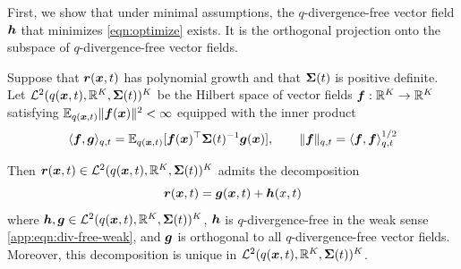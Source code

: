 First, we show that under minimal assumptions, the $q$-divergence-free vector field $\boldsymbol{h}$ that minimizes \cref{eqn:optimize} exists. It is the orthogonal projection onto the subspace of $q$-divergence-free vector fields.
\begin{theorem}\label{app:thm:hilbert-projection}
     Suppose that $\boldsymbol{r}(\boldsymbol{x}, t)$ has polynomial growth and that $\boldsymbol{\Sigma}(t)$ is positive definite. 
     Let $\mathcal{L}^2(q(\boldsymbol{x}, t), \mathbb{R}^K, \boldsymbol{\Sigma}(t))^K$ be the Hilbert space of vector fields $\boldsymbol{f}: \mathbb{R}^K \to \mathbb{R}^K$ satisfying $\mathbb{E}_{q(\boldsymbol{x}, t)}\|\boldsymbol{f}(\boldsymbol{x})\|^2 < \infty$ equipped with the inner product 
     \begin{equation}\label{app:eqn:l2-inner-prod}
         \langle \boldsymbol{f}, \boldsymbol{g} \rangle_{q, t} = \mathbb{E}_{q(\boldsymbol{x}, t)} [\boldsymbol{f}(\boldsymbol{x})^\top \boldsymbol{\Sigma}(t)^{-1} \boldsymbol{g}(\boldsymbol{x})], \qquad \| \boldsymbol{f} \|_{q, t} = \langle \boldsymbol{f}, \boldsymbol{f} \rangle_{q, t}^{1/2}
    \end{equation}

     \smallskip
     Then $\boldsymbol{r}(\boldsymbol{x}, t) \in \mathcal{L}^2(q(\boldsymbol{x}, t), \mathbb{R}^K, \boldsymbol{\Sigma}(t))^K$ admits the decomposition 
     \begin{equation}\label{app:eqn:helmholtz-weak}
         \boldsymbol{r}(\boldsymbol{x}, t) = \boldsymbol{g}(\boldsymbol{x}, t) + \boldsymbol{h}(x, t)
     \end{equation}
     where $\boldsymbol{h}, \boldsymbol{g} \in  \mathcal{L}^2(q(\boldsymbol{x}, t), \mathbb{R}^K, \boldsymbol{\Sigma}(t))^K$, $\boldsymbol{h}$ is $q$-divergence-free in the weak sense \cref{app:eqn:div-free-weak}, and $\boldsymbol{g}$ is orthogonal to all $q$-divergence-free vector fields.
     Moreover, this decomposition is unique in $\mathcal{L}^2(q(\boldsymbol{x}, t), \mathbb{R}^K, \boldsymbol{\Sigma}(t))^K$. 
\end{theorem}
